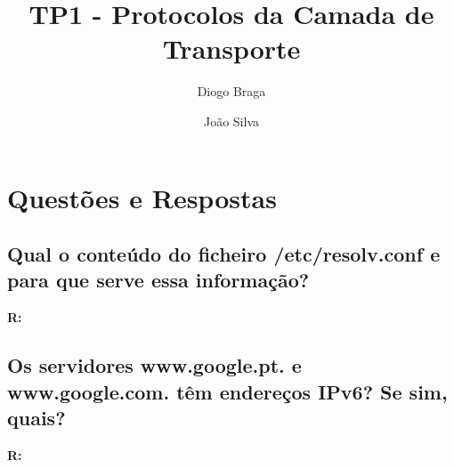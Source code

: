 \documentclass{llncs}
\begin{document}
\mainmatter
\title{TP1 - Protocolos da Camada de Transporte}


\author{Diogo Braga \and João Silva}



\date{}


\maketitle

\section{Questões e Respostas}

\subsection{\textbf{Qual o conteúdo do ficheiro /etc/resolv.conf e para que serve essa informação?}}
\textbf{R:} 

\subsection{\textbf{Os servidores www.google.pt. e www.google.com. têm endereços IPv6? Se sim, quais?}}
\textbf{R:} 
\end{document}
